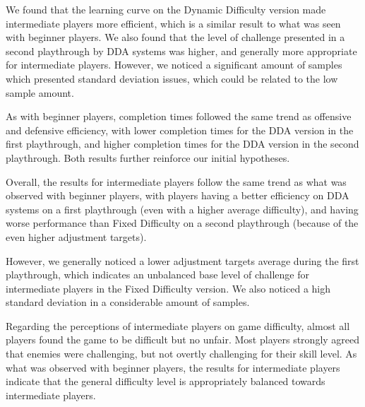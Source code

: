 We found that the learning curve on the Dynamic Difficulty version made intermediate players more efficient, which is a similar result to what was seen with beginner players. We also found that the level of challenge presented in a second playthrough by DDA systems was higher, and generally more appropriate for intermediate players. However, we noticed a significant amount of samples which presented standard deviation issues, which could be related to the low sample amount.

As with beginner players, completion times followed the same trend as offensive and defensive efficiency, with lower completion times for the DDA version in the first playthrough, and higher completion times for the DDA version in the second playthrough. Both results further reinforce our initial hypotheses.

Overall, the results for intermediate players follow the same trend as what was observed with beginner players, with players having a better efficiency on DDA systems on a first playthrough (even with a higher average difficulty), and having worse performance than Fixed Difficulty on a second playthrough (because of the even higher adjustment targets).

However, we generally noticed a lower adjustment targets average during the first playthrough, which indicates an unbalanced base level of challenge for intermediate players in the Fixed Difficulty version. We also noticed a high standard deviation in a considerable amount of samples.


Regarding the perceptions of intermediate players on game difficulty, almost all players found the game to be difficult but no unfair. Most players strongly agreed that enemies were challenging, but not overtly challenging for their skill level. As what was observed with beginner players, the results for intermediate players indicate that the general difficulty level is appropriately balanced towards intermediate players.


